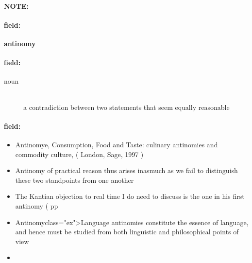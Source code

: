 \documentclass[12pt]{article}
\newenvironment{note}{\paragraph{NOTE:}}{}
\newenvironment{field}{\paragraph{field:}}{}
\begin{document}
\begin{note}
\begin{field}
\textbf{\large antinomy}
\end{field}


\begin{field}
\begin{description}
\item[noun] \hfill \\ 
a contradiction between two statements that seem equally reasonable

\end{description}
\end{field}

\begin{field}
\begin{itemize}
\item Antinomye, Consumption, Food and Taste: culinary antinomies and commodity culture, ( London, Sage, 1997 )
\item Antinomy of practical reason thus arises inasmuch as we fail to distinguish these two standpoints from one another
\item The Kantian objection to real time I do need to discuss is the one in his first antinomy ( pp
\item Antinomyclass="ex">Language antinomies constitute the essence of language, and hence must be studied from both linguistic and philosophical points of view
\item 
\end{itemize}
\end{field}
\end{note}
\end{document}
